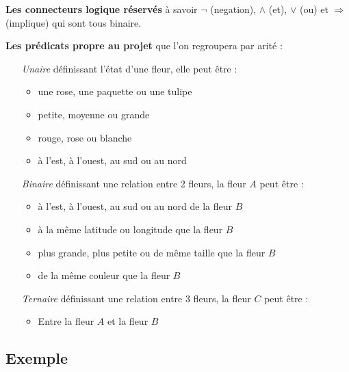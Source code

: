 \documentclass{article}
\theoremstyle{plain}
\theoremstyle{remark}
\begin{document}
\begin{description}
	\item \textbf{Les connecteurs logique réservés} à savoir $\lnot$ (negation), $\land$ (et), $\lor$ (ou) et $\Rightarrow$ (implique) qui sont tous binaire.
	\item \textbf{Les prédicats propre au projet} que l'on regroupera par arité :
		\begin{itemize}
			\item[\textit{Unaire}] définissant l'état d'une fleur, elle peut être :
				\begin{itemize}
					\item une rose, une paquette ou une tulipe
					\item petite, moyenne ou grande
					\item rouge, rose ou blanche
					\item à l'est, à l'ouest, au sud ou au nord
				\end{itemize}
			\item[\textit{Binaire}] définissant une relation entre 2 fleurs, la fleur $A$ peut être :
				\begin{itemize}
					\item à l'est, à l'ouest, au sud ou au nord de la fleur $B$
					\item à la même latitude ou longitude que la fleur $B$
					\item plus grande, plus petite ou de même taille que la fleur $B$
					\item de la même couleur que la fleur $B$
				\end{itemize}
			\item[\textit{Ternaire}] définissant une relation entre 3 fleurs, la fleur $C$ peut être :
				\begin{itemize}
					\item Entre la fleur $A$ et la fleur $B$
				\end{itemize}
		\end{itemize}
\end{description}

\subsection{Exemple}
\end{document}
